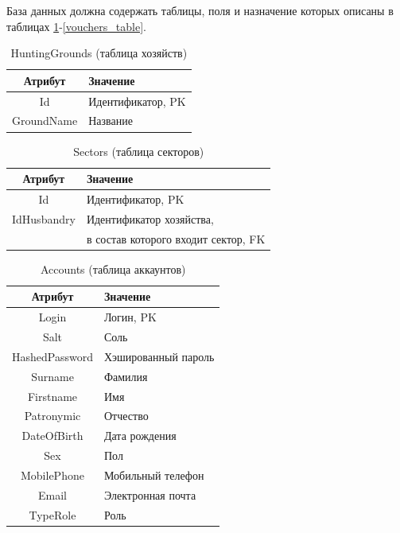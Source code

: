 	База данных должна содержать таблицы, поля и назначение которых описаны в таблицах 
	\ref{hgtable}-\ref{vouchers_table}.
	
	\begin{table}[h] 
		\begin{center}
			\caption{HuntingGrounds (таблица хозяйств)}
			\label{hgtable}
			\begin{tabular}{| c | l |}
				\hline
				\textbf{Атрибут} 	& \textbf{Значение} \\
				\hline
				Id 					&	Идентификатор, PK \\ 
				\hline
				GroundName 			&	Название \\ 
				\hline
			\end{tabular}
		\end{center}
	\end{table}

	\begin{table}[h] 
		\begin{center}
			\caption{Sectors (таблица секторов)}
			\label{sec_table}
			\begin{tabular}{| c | l |}
				\hline
				\textbf{Атрибут} 	& \textbf{Значение} \\
				\hline
				Id 					&	Идентификатор, PK \\ 
				\hline
				IdHusbandry 			&	Идентификатор хозяйства,  \\ 
				& в состав которого входит сектор, FK \\
				\hline
			\end{tabular}
		\end{center}
	\end{table}

	\begin{table}[pt!]
		\begin{center}
			\caption{Accounts (таблица аккаунтов)}
			\label{acc_table}
			\begin{tabular}{| c | l |}
				\hline
				\textbf{Атрибут} 	& \textbf{Значение} \\
				\hline
				Login 				&	Логин, PK \\ 
				\hline
				Salt 				&	Соль  \\ 
				\hline
				HashedPassword 		&	Хэшированный пароль \\ 
				\hline
				Surname 			&	Фамилия \\ 
				\hline
				Firstname 			&	Имя \\ 
				\hline
				Patronymic 			&	Отчество \\ 
				\hline
				DateOfBirth 		&	Дата рождения \\ 
				\hline
				Sex 				&	Пол \\ 
				\hline
				MobilePhone 		&	Мобильный телефон \\ 
				\hline
				Email 				&	Электронная почта \\ 
				\hline
				TypeRole 			&	Роль \\ 
				\hline
			\end{tabular}
		\end{center}
	\end{table}

